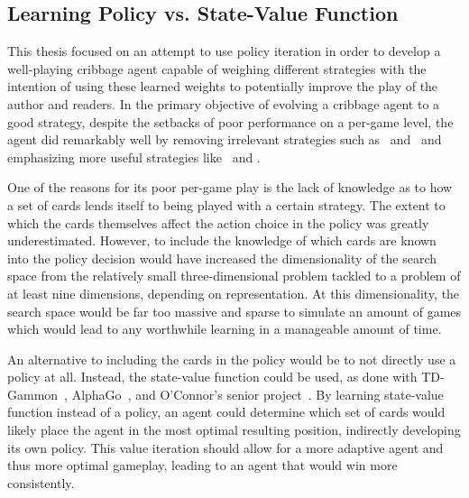 
\subsection{Learning Policy vs. State-Value Function}
\label{sec:disc-value}

This thesis focused on an attempt to use policy iteration
in order to develop a well-playing
cribbage agent capable of weighing different strategies
with the intention of using these learned weights to 
potentially
improve the play of the author and readers.
%
In the primary objective of evolving a cribbage agent to a good strategy,
despite the setbacks of poor performance on a per-game level,
the agent did remarkably well
by removing irrelevant strategies
such as \handmaxmed\ and \peggingmaxmedgained\ 
and emphasizing more useful strategies
like \handmaxavg\ and \handmaxmin.

One of the reasons for its poor per-game play
is the lack of knowledge as to how a set of cards lends itself to being played
with a certain strategy.
%
The extent to which the cards themselves affect the action choice in the policy
was greatly underestimated.
%
However,
to include the knowledge of which cards are known into the policy decision
would have increased the dimensionality of the search space from the relatively
small three-dimensional problem tackled to a problem of at least nine
dimensions,
depending on representation.
%
At this dimensionality,
the search space would be far too massive and sparse to simulate an amount of
games which would lead to any worthwhile learning
in a manageable amount of time.

An alternative to including the cards in the policy would be to not
directly use a policy at all.
%
Instead,
the state-value function could be used,
as done with TD-Gammon~\cite{tdgammon},
AlphaGo~\cite{deepmind_alphago,deepmind_alphago_zero},
and O'Connor's senior project~\cite{roconnor_cs486}.
%
By learning state-value function instead of a policy,
an agent could determine which set of cards would likely place the agent in the
most optimal resulting position,
indirectly developing its own policy.
%
This value iteration should allow for a more adaptive agent and thus more
optimal gameplay,
leading to an agent that would win more consistently.

%
